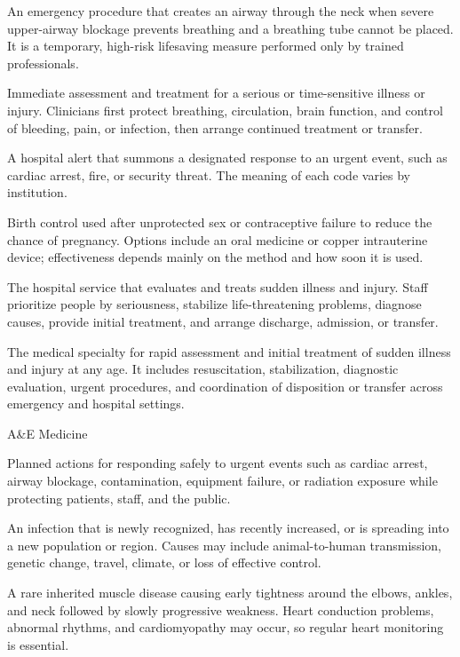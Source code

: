  An emergency procedure that creates an airway through the neck when severe upper-airway blockage prevents breathing and a breathing tube cannot be placed. It is a temporary, high-risk lifesaving measure performed only by trained professionals.

 Immediate assessment and treatment for a serious or time-sensitive illness or injury. Clinicians first protect breathing, circulation, brain function, and control of bleeding, pain, or infection, then arrange continued treatment or transfer.

 A hospital alert that summons a designated response to an urgent event, such as cardiac arrest, fire, or security threat. The meaning of each code varies by institution.

 Birth control used after unprotected sex or contraceptive failure to reduce the chance of pregnancy. Options include an oral medicine or copper intrauterine device; effectiveness depends mainly on the method and how soon it is used.

 The hospital service that evaluates and treats sudden illness and injury. Staff prioritize people by seriousness, stabilize life-threatening problems, diagnose causes, provide initial treatment, and arrange discharge, admission, or transfer.

 The medical specialty for rapid assessment and initial treatment of sudden illness
and injury at any age. It includes resuscitation, stabilization, diagnostic evaluation, urgent
procedures, and coordination of disposition or transfer across emergency and hospital
settings.

\synonyms
A\&E Medicine

 Planned actions for responding safely to urgent events such as cardiac arrest, airway blockage, contamination, equipment failure, or radiation exposure while protecting patients, staff, and the public.

 An infection that is newly recognized, has recently increased, or is spreading into a new population or region. Causes may include animal-to-human transmission, genetic change, travel, climate, or loss of effective control.

 A rare inherited muscle disease causing early tightness around the elbows, ankles, and neck followed by slowly progressive weakness. Heart conduction problems, abnormal rhythms, and cardiomyopathy may occur, so regular heart monitoring is essential.

